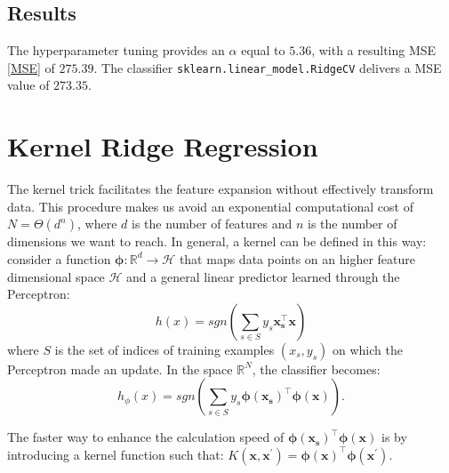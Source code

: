 \documentclass{article}
\begin{document}
\subsection{Results}
The hyperparameter tuning provides an $\alpha$ equal to $5.36$, with a resulting MSE \eqref{MSE} of $275.39$. The classifier \texttt{sklearn.linear\_model.RidgeCV} delivers a MSE value of $273.35$.

\section{Kernel Ridge Regression}
The kernel trick facilitates the feature expansion without effectively transform data. This procedure makes us avoid an exponential computational cost of $N = \Theta(d^n)$, where $d$ is the number of features and $n$ is the number of dimensions we want to reach. In general, a kernel can be defined in this way: consider a function $\boldsymbol{\phi}: \mathbb{R}^d \rightarrow \mathcal{H}$ that maps data points on an higher feature dimensional space $\mathcal{H}$ and a general linear predictor learned through the Perceptron: \begin{equation}
h(x) = sgn\left(\sum_{s \in S}y_s\boldsymbol{x_s^\top}\boldsymbol{x}\right)
\end{equation} where $S$ is the set of indices of training examples $(x_s,y_s)$ on which the Perceptron made an update. In the space $\mathbb{R}^N$, the classifier becomes: \begin{equation}
h{_\phi}(x) = sgn\left(\sum_{s \in S}y_s\boldsymbol{\phi(x_s)^\top}\boldsymbol{\phi(x)}\right).
\end{equation}
    
    
The faster way to enhance the calculation speed of $\boldsymbol{\phi(x_s)^\top}\boldsymbol{\phi(x)}$ is by introducing a kernel function such that: $K(\boldsymbol{x},\boldsymbol{x^\prime}) = \boldsymbol{\phi(x)^\top}\boldsymbol{\phi(x^\prime)}.$
\end{document}
